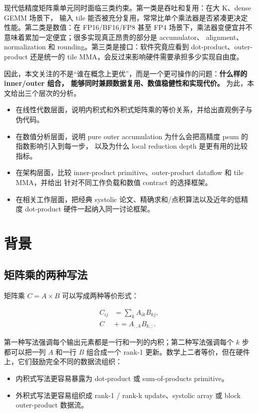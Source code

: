 \documentclass[UTF8,11pt,a4paper]{ctexart}
\begin{document}
现代低精度矩阵乘单元同时面临三类约束。第一类是吞吐和复用：在大 K、dense GEMM 场景下，
输入 tile 能否被充分复用，常常比单个乘法器是否紧凑更决定性能。第二类是数值：在 FP16/BF16/FP8
甚至 FP4 场景下，乘法器变便宜并不意味着累加一定便宜；很多实现真正昂贵的部分是 accumulator、
alignment、normalization 和 rounding。第三类是接口：软件究竟应看到 dot-product、outer-product
还是统一的 tile MMA，会反过来影响硬件需要承担多少实现自由度。

因此，本文关注的不是“谁在概念上更优”，而是一个更可操作的问题：\textbf{什么样的 inner/outer 组合，
能够同时兼顾数据复用、数值稳健性和实现代价。} 为此，本文给出三个层次的分析。

\begin{itemize}
  \item 在线性代数层面，说明内积式和外积式矩阵乘的等价关系，并给出直观例子与伪代码。
  \item 在数值分析层面，说明 pure outer accumulation 为什么会把高精度 psum 的指数影响引入到每一步，
  以及为什么 local reduction depth 是更有用的比较指标。
  \item 在架构层面，比较 inner-product primitive、outer-product dataflow 和 tile MMA，并给出
  针对不同工作负载和数值 contract 的选择框架。
  \item 在相关工作层面，把经典 systolic 论文、精确求和/点积算法以及近年的低精度 dot-product
  硬件一起纳入同一讨论框架。
\end{itemize}

\section{背景}

\subsection{矩阵乘的两种写法}

矩阵乘 $C=A\times B$ 可以写成两种等价形式：

\begin{align}
  C_{ij} &= \sum_k A_{ik}B_{kj}, \\
  C &\mathrel{+}= A_{:,k}B_{k,:}.
\end{align}

第一种写法强调每个输出元素都是一行和一列的内积；第二种写法强调每个 $k$ 步都可以把一列 $A$
和一行 $B$ 组合成一个 rank-1 更新。数学上二者等价，但在硬件上，它们鼓励完全不同的数据流组织：

\begin{itemize}
  \item 内积式写法更容易暴露为 dot-product 或 sum-of-products primitive。
  \item 外积式写法更容易组织成 rank-1 / rank-k update、systolic array 或 block outer-product
  数据流。
\end{itemize}
\end{document}
